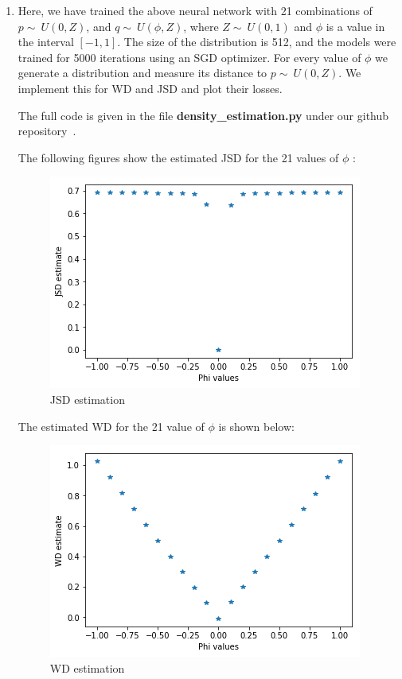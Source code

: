 \begin{enumerate}
	
	
	\item Here, we have trained the above neural network with 21 combinations of $p\sim~U(0,Z)$, and $q\sim~U(\phi,Z)$, where $Z\sim~U(0,1)$ and $\phi$ is a value in the interval $[-1,1]$. The size of the distribution is 512, and the models were trained for 5000 iterations using an SGD optimizer. For every value of $\phi$ we generate a distribution and measure its distance to $p\sim~U(0,Z)$. We implement this for WD and JSD and plot their losses. 
	
	The full code is given in the file \textbf{density\_estimation.py} under our github repository~\cite{github}.
	
	The following figures show the estimated JSD for the 21 values of $\phi$ :
	\begin{figure}[H]
		\centering
		\includegraphics[scale=0.8]{jsd.png}
		\caption{JSD estimation}
		\label{fig:jsd}
	\end{figure}
	
	The estimated WD for the 21 value of $\phi$ is shown below:
	\begin{figure}[H]
		\centering
		\includegraphics[scale=0.8]{wd.png}
		\caption{WD estimation}
		\label{fig:wd}
	\end{figure}


\end{enumerate}
